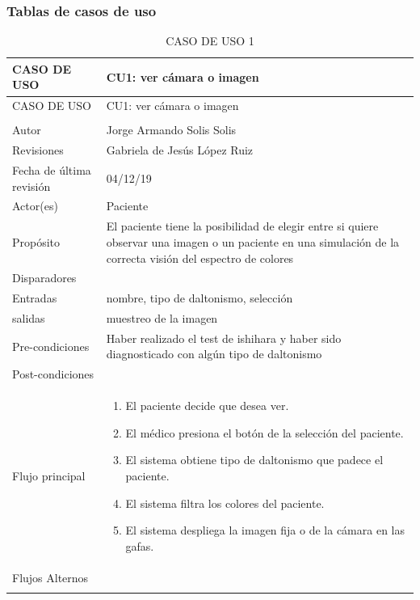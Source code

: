 \documentclass[10pt]{article}
\begin{document}
\subsubsection{Tablas de casos de uso}
\begin{longtable}{|p{3.8cm}|p{10.8cm}|}
\hline
CASO DE USO & CU1: ver cámara o imagen\\
\hline 
\endfirsthead

\hline

CASO DE USO & CU1: ver cámara o imagen\\
\hline 
\endhead

\multicolumn{2}{c}{}
\endfoot

\endlastfoot
\hline
versión & 1\\
\hline
Autor & Jorge Armando Solis Solis\\
\hline
Revisiones & Gabriela de Jesús López Ruiz \\
\hline
Fecha de última revisión & 04/12/19\\
\hline
Actor(es) & Paciente \\
\hline
Propósito & El paciente tiene la posibilidad de elegir entre si quiere observar una imagen o un paciente en una simulación de la correcta visión del espectro de colores\\
\hline
Disparadores & \\
\hline
Entradas & nombre, tipo de daltonismo, selección\\
\hline
salidas & muestreo de la imagen\\
\hline
Pre-condiciones & Haber realizado el test de ishihara y haber sido diagnosticado con algún tipo de daltonismo \\
\hline
Post-condiciones &   \\
\hline
Flujo principal & \begin{enumerate}
    \item El paciente decide que desea ver.
    \item El médico presiona el botón de la selección del paciente.
    \item El sistema obtiene tipo de daltonismo que padece el paciente.
    \item El sistema filtra los colores del paciente.
    \item El sistema despliega la imagen fija o de la cámara en las gafas.
\end{enumerate}
    \\
\hline
Flujos Alternos & \\
\hline
\caption{CASO DE USO 1}
\label{tabla1}
\end{longtable}
\end{document}
